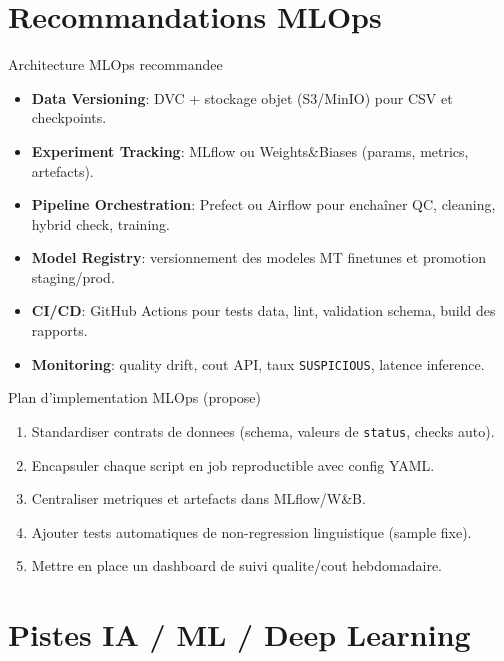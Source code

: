\documentclass[10pt,aspectratio=169]{beamer}
\begin{document}
\section{Recommandations MLOps}

\begin{frame}{Architecture MLOps recommandee}
  \begin{itemize}
    \item \textbf{Data Versioning}: DVC + stockage objet (S3/MinIO) pour CSV et checkpoints.
    \item \textbf{Experiment Tracking}: MLflow ou Weights\&Biases (params, metrics, artefacts).
    \item \textbf{Pipeline Orchestration}: Prefect ou Airflow pour encha\^iner QC, cleaning, hybrid check, training.
    \item \textbf{Model Registry}: versionnement des modeles MT finetunes et promotion staging/prod.
    \item \textbf{CI/CD}: GitHub Actions pour tests data, lint, validation schema, build des rapports.
    \item \textbf{Monitoring}: quality drift, cout API, taux \texttt{SUSPICIOUS}, latence inference.
  \end{itemize}
\end{frame}

\begin{frame}{Plan d'implementation MLOps (propose)}
  \begin{enumerate}
    \item Standardiser contrats de donnees (schema, valeurs de \texttt{status}, checks auto).
    \item Encapsuler chaque script en job reproductible avec config YAML.
    \item Centraliser metriques et artefacts dans MLflow/W\&B.
    \item Ajouter tests automatiques de non-regression linguistique (sample fixe).
    \item Mettre en place un dashboard de suivi qualite/cout hebdomadaire.
  \end{enumerate}
\end{frame}

\section{Pistes IA / ML / Deep Learning}
\end{document}
